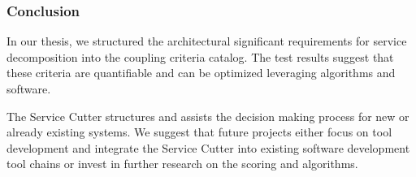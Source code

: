 \subsubsection{Conclusion}
In our thesis, we structured the architectural significant requirements for service decomposition into the coupling criteria catalog. The test results suggest that these criteria are quantifiable and can be optimized leveraging algorithms and software. 

The Service Cutter structures and assists the decision making process for new or already existing systems. We suggest that future projects either focus on tool development and integrate the Service Cutter into existing software development tool chains or invest in further research on the scoring and algorithms. 
